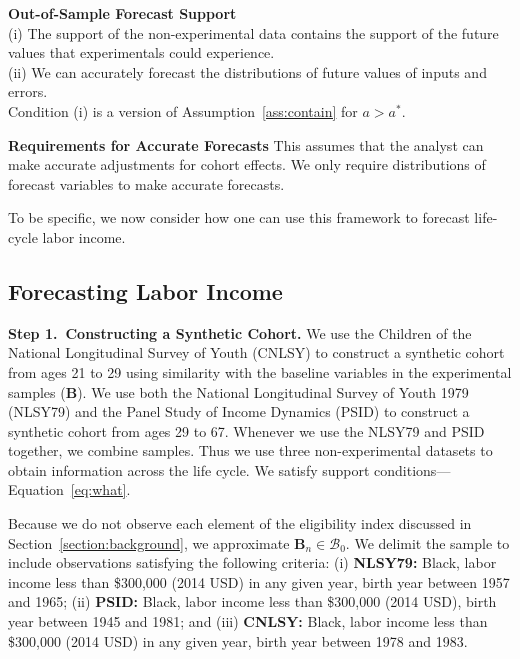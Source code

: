 \onehalfspacing
\begin{assumption} \textbf{Out-of-Sample Forecast Support} \label{ass:more}\\
\noindent (i) The support of the non-experimental data contains the support of the future values that experimentals could experience.\\
\noindent (ii) We can accurately forecast the distributions of future values of inputs and errors.\\ 
\noindent Condition (i) is a version of Assumption~\ref{ass:contain} for $a>a^*$.
\end{assumption}

\begin{remark} \textbf{Requirements for Accurate Forecasts}
This assumes that the analyst can make accurate adjustments for cohort effects. We only require distributions of forecast variables to make accurate forecasts.
\end{remark}
\doublespacing

To be specific, we now consider how one can use this framework to forecast life-cycle labor income.

\subsection{Forecasting Labor Income} \label{sec:forecasting}

\noindent \textbf{Step 1.\ Constructing a Synthetic Cohort.} We use the Children of the National Longitudinal Survey of Youth (CNLSY) to construct a synthetic cohort from ages 21 to 29 using similarity with the baseline variables in the experimental samples ($\bm{B}$). We use both the National Longitudinal Survey of Youth 1979 (NLSY79) and the Panel Study of Income Dynamics (PSID) to construct a synthetic cohort from ages 29 to 67. Whenever we use the NLSY79 and PSID together, we combine samples. Thus we use three non-experimental datasets to obtain information across the life cycle. We satisfy support conditions---Equation~\eqref{eq:what}.

Because we do not observe each element of the eligibility index discussed in Section~\ref{section:background}, we approximate $\bm{B}_{n} \in \mathcal{B}_0$. We delimit the sample to include observations satisfying the following criteria: (i) \textbf{NLSY79:} Black, labor income less than \$300,000 (2014 USD) in any given year, birth year between 1957 and 1965; (ii) \textbf{PSID:} Black, labor income less than \$300,000 (2014 USD), birth year between 1945 and 1981; and (iii) \textbf{CNLSY:} Black, labor income less than \$300,000 (2014 USD) in any given year, birth year between 1978 and 1983.

